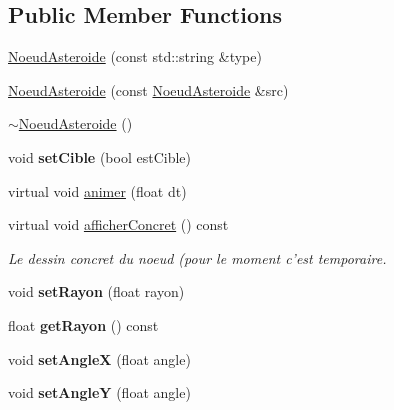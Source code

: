 \subsection*{Public Member Functions}
\begin{DoxyCompactItemize}
\item 
\hyperlink{class_noeud_asteroide_a6879cff59fdc09b742b9e0850bec62a8}{Noeud\-Asteroide} (const std\-::string \&type)
\item 
\hyperlink{class_noeud_asteroide_a0cf8165f8385ddfc802312eb3c4abe57}{Noeud\-Asteroide} (const \hyperlink{class_noeud_asteroide}{Noeud\-Asteroide} \&src)
\item 
\hyperlink{class_noeud_asteroide_adbf6fbd81915741bb2f2c44907489e6e}{$\sim$\-Noeud\-Asteroide} ()
\item 
\hypertarget{class_noeud_asteroide_a987232997d11bee582d5e26cbda9851d}{void {\bfseries set\-Cible} (bool est\-Cible)}\label{class_noeud_asteroide_a987232997d11bee582d5e26cbda9851d}

\item 
virtual void \hyperlink{class_noeud_asteroide_a4f0750d3acc170de96351168456835d8}{animer} (float dt)
\item 
virtual void \hyperlink{class_noeud_asteroide_ab0db59bbf10bb8c24ccf62b84cf2bf10}{afficher\-Concret} () const 
\begin{DoxyCompactList}\small\item\em Le dessin concret du noeud (pour le moment c'est temporaire. \end{DoxyCompactList}\item 
\hypertarget{class_noeud_asteroide_aa61b44a5531337050117382dd2bbd94d}{void {\bfseries set\-Rayon} (float rayon)}\label{class_noeud_asteroide_aa61b44a5531337050117382dd2bbd94d}

\item 
\hypertarget{class_noeud_asteroide_a2924a9031e94faaf53a26b2afc8f360c}{float {\bfseries get\-Rayon} () const }\label{class_noeud_asteroide_a2924a9031e94faaf53a26b2afc8f360c}

\item 
\hypertarget{class_noeud_asteroide_a490e5be76099dfa581df7c104b69162d}{void {\bfseries set\-Angle\-X} (float angle)}\label{class_noeud_asteroide_a490e5be76099dfa581df7c104b69162d}

\item 
\hypertarget{class_noeud_asteroide_a22a25b8240e0d3bb45e3295192dd42e9}{void {\bfseries set\-Angle\-Y} (float angle)}\label{class_noeud_asteroide_a22a25b8240e0d3bb45e3295192dd42e9}


\end{DoxyCompactItemize}
